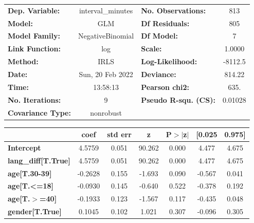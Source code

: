 \begin{center}
\begin{tabular}{lclc}
\toprule
\textbf{Dep. Variable:}     & interval\_minutes & \textbf{  No. Observations:  } &      813    \\
\textbf{Model:}             &        GLM        & \textbf{  Df Residuals:      } &      805    \\
\textbf{Model Family:}      &  NegativeBinomial & \textbf{  Df Model:          } &        7    \\
\textbf{Link Function:}     &        log        & \textbf{  Scale:             } &    1.0000   \\
\textbf{Method:}            &        IRLS       & \textbf{  Log-Likelihood:    } &   -8112.5   \\
\textbf{Date:}              &  Sun, 20 Feb 2022 & \textbf{  Deviance:          } &    814.22   \\
\textbf{Time:}              &      13:58:13     & \textbf{  Pearson chi2:      } &     635.    \\
\textbf{No. Iterations:}    &         9         & \textbf{  Pseudo R-squ. (CS):} &  0.01028    \\
\textbf{Covariance Type:}   &     nonrobust     & \textbf{                     } &             \\
\bottomrule
\end{tabular}
\begin{tabular}{lcccccc}
                            & \textbf{coef} & \textbf{std err} & \textbf{z} & \textbf{P$> |$z$|$} & \textbf{[0.025} & \textbf{0.975]}  \\
\midrule
\textbf{Intercept}          &       4.5759  &        0.051     &    90.262  &         0.000        &        4.477    &        4.675     \\
\textbf{lang\_diff[T.True]} &       4.5759  &        0.051     &    90.262  &         0.000        &        4.477    &        4.675     \\
\textbf{age[T.30-39]}       &      -0.2628  &        0.155     &    -1.693  &         0.090        &       -0.567    &        0.041     \\
\textbf{age[T.<=18]}        &      -0.0930  &        0.145     &    -0.640  &         0.522        &       -0.378    &        0.192     \\
\textbf{age[T.$>$=40]}      &      -0.1933  &        0.123     &    -1.567  &         0.117        &       -0.435    &        0.048     \\
\textbf{gender[T.True]}     &       0.1045  &        0.102     &     1.021  &         0.307        &       -0.096    &        0.305     \\

\end{tabular}
\end{center}
